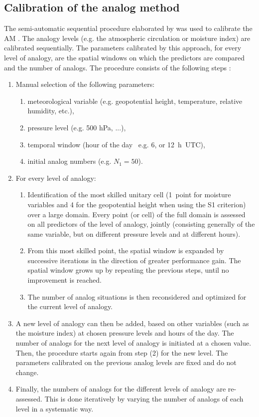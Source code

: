 \documentclass[hess, manuscript]{copernicus}
\begin{document}
\subsection{Calibration of the analog method}
\label{sec:calibration}

The semi-automatic sequential procedure elaborated by \citet{Bontron2004} was used to calibrate the AM \cite[see also ][]{Radanovics2013, BenDaoud2016}. The analogy levels (e.g. the atmospheric circulation or moisture index) are calibrated sequentially. The parameters calibrated by this approach, for every level of analogy, are the spatial windows on which the predictors are compared and the number of analogs. The procedure consists of the following steps \citep{Bontron2004}:

\begin{enumerate}
	\item Manual selection of the following parameters:
	\begin{enumerate}
		\item meteorological variable (e.g. geopotential height, temperature, relative humidity, etc.),
		\item pressure level (e.g. 500 hPa, ...),
		\item temporal window (hour of the day \textendash\ e.g. 6, or 12~h~UTC),
		\item initial analog numbers (e.g. $N_{1}=50$).
	\end{enumerate}
	
	\item For every level of analogy:
	\begin{enumerate}
		\item Identification of the most skilled unitary cell (1~point for moisture variables and 4 for the geopotential height when using the S1 criterion) over a large domain. Every point (or cell) of the full domain is assessed on all predictors of the level of analogy, jointly (consisting generally of the same variable, but on different pressure levels and at different hours).
		\item From this most skilled point, the spatial window is expanded by successive iterations in the direction of greater performance gain. The spatial window grows up by repeating the previous steps, until no improvement is reached.
		\item The number of analog situations is then reconsidered and optimized for the current level of analogy.
	\end{enumerate}
	\item A new level of analogy can then be added, based on other variables (such as the moisture index) at chosen pressure levels and hours of the day. The number of analogs for the next level of analogy is initiated at a chosen value. Then, the procedure starts again from step (2) for the new level. The parameters calibrated on the previous analog levels are fixed and do not change. 
	\item Finally, the numbers of analogs for the different levels of analogy are re-assessed. This is done iteratively by varying the number of analogs of each level in a systematic way.
\end{enumerate}
\end{document}
